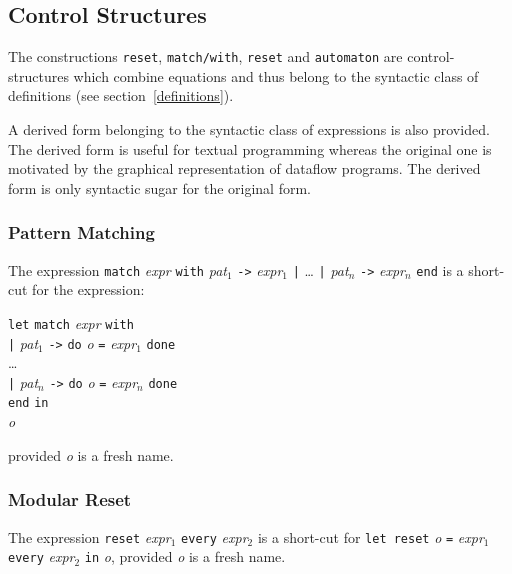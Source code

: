 \documentclass[11pt,titlepage,twoside]{report}
\newcommand{\In}{\mbox{{\tt in}}}
\newcommand{\Minusgreater}{\mbox{{\tt ->}}}
\newcommand{\term}[1]{{\tt #1}}
\newcommand{\nterm}[1]{{\em #1}}
\begin{document}
\subsection{Control Structures}
The constructions \verb-reset-, \verb-match/with-, \verb-reset- and
\verb-automaton- are control-structures which combine equations and
thus belong to the syntactic class of definitions (see
section~\ref{definitions}).

A derived form belonging to the syntactic class of expressions is also
provided. The derived form is useful for textual programming whereas
the original one is motivated by the graphical representation of
dataflow programs. The derived form is only syntactic sugar for the
original form.

\subsubsection{Pattern Matching}
The expression
\term{match} \nterm{expr} \term{with} 
  \nterm{pat}$_1$ \term{\Minusgreater} \nterm{expr}$_1$ \term{|} \dots 
\term{|} \nterm{pat}$_n$ \term{\Minusgreater} \nterm{expr}$_n$ \term{end}
is a short-cut for the expression:

\begin{center}
\begin{tabbing}
\term{let} \= \term{match} \nterm{expr} \term{with} \\ 
           \> \term{|} \nterm{pat}$_1$ \term{\Minusgreater} 
               \term{do} \nterm{o} \term{=} \nterm{expr}$_1$ \term{done} \\
           \> \dots \\
           \> \term{|} \nterm{pat}$_n$ \term{\Minusgreater} 
               \term{do} \nterm{o} \term{=} \nterm{expr}$_n$ \term{done} \\
           \> \term{end} \In \\
\nterm{o}
\end{tabbing}
\end{center}
provided \nterm{o} is a fresh name.

\subsubsection{Modular Reset}
The expression \term{reset} \nterm{expr}$_1$ \term{every} \nterm{expr}$_2$
is a short-cut for
\term{let reset} \nterm{o} \term{=} \nterm{expr}$_1$ 
\term{every} \nterm{expr}$_2$ \term{in} \nterm{o},
provided \nterm{o} is a fresh name.
\end{document}
